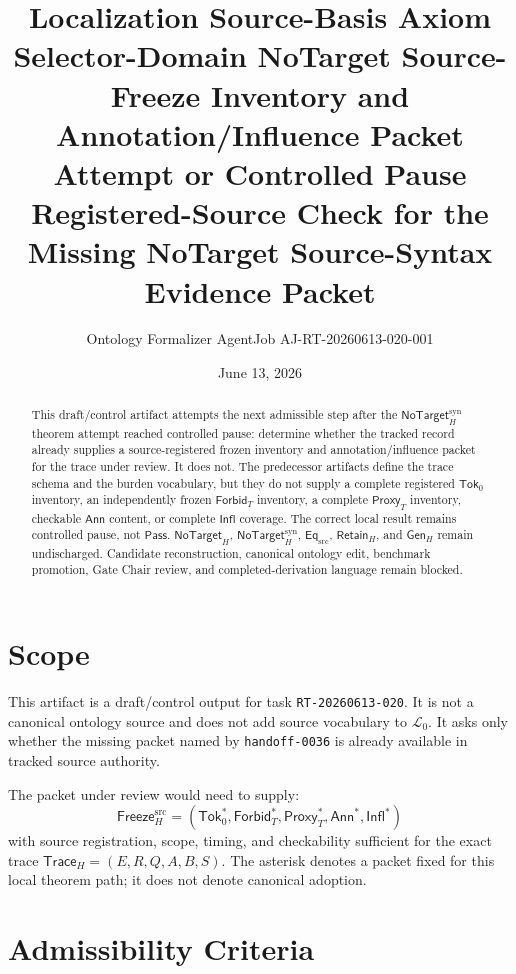 \documentclass[11pt]{article}
\title{\textbf{Localization Source-Basis Axiom Selector-Domain NoTarget Source-Freeze Inventory and Annotation/Influence Packet Attempt or Controlled Pause}\\[0.35em]
\large Registered-Source Check for the Missing NoTarget Source-Syntax Evidence Packet}
\author{Ontology Formalizer AgentJob AJ-RT-20260613-020-001}
\date{June 13, 2026}
\newcommand{\Lang}{\mathcal{L}_{0}}
\newcommand{\GenH}{\mathsf{Gen}_{H}}
\newcommand{\EqSrc}{\mathsf{Eq}_{\mathrm{src}}}
\newcommand{\RetainH}{\mathsf{Retain}_{H}}
\newcommand{\NoTargetH}{\mathsf{NoTarget}_{H}}
\newcommand{\NoTargetSyn}{\mathsf{NoTarget}_{H}^{\mathrm{syn}}}
\newcommand{\SrcTok}{\mathsf{Tok}_{0}}
\newcommand{\ForbidT}{\mathsf{Forbid}_{T}}
\newcommand{\ProxyT}{\mathsf{Proxy}_{T}}
\newcommand{\TraceH}{\mathsf{Trace}_{H}}
\newcommand{\Annot}{\mathsf{Ann}}
\newcommand{\Influence}{\mathsf{Infl}}
\newcommand{\FreezeH}{\mathsf{Freeze}_{H}}
\newcommand{\Pass}{\mathsf{Pass}}
\begin{document}
\maketitle

\begin{abstract}
This draft/control artifact attempts the next admissible step after the
\(\NoTargetSyn\) theorem attempt reached controlled pause: determine
whether the tracked record already supplies a source-registered frozen
inventory and annotation/influence packet for the trace under review. It
does not. The predecessor artifacts define the trace schema and the burden
vocabulary, but they do not supply a complete registered \(\SrcTok\)
inventory, an independently frozen \(\ForbidT\) inventory, a complete
\(\ProxyT\) inventory, checkable \(\Annot\) content, or complete
\(\Influence\) coverage. The correct local result remains controlled pause,
not \(\Pass\). \(\NoTargetH\), \(\NoTargetSyn\), \(\EqSrc\), \(\RetainH\),
and \(\GenH\) remain undischarged. Candidate reconstruction, canonical
ontology edit, benchmark promotion, Gate Chair review, and
completed-derivation language remain blocked.
\end{abstract}

\section{Scope}

This artifact is a draft/control output for task \texttt{RT-20260613-020}.
It is not a canonical ontology source and does not add source vocabulary to
\(\Lang\). It asks only whether the missing packet named by
\texttt{handoff-0036} is already available in tracked source authority.

The packet under review would need to supply:
\[
    \FreezeH^{\mathrm{src}} =
    (\SrcTok^{*},\ForbidT^{*},\ProxyT^{*},\Annot^{*},\Influence^{*})
\]
with source registration, scope, timing, and checkability sufficient for
the exact trace \(\TraceH=(E,R,Q,A,B,S)\). The asterisk denotes a packet
fixed for this local theorem path; it does not denote canonical adoption.

\section{Admissibility Criteria}
\end{document}

